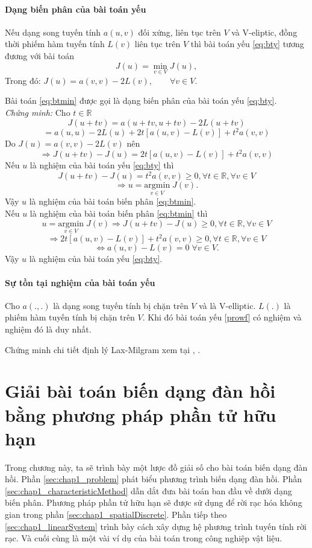 \documentclass[
12pt, %
oneside, %
english, %
onehalfspacing, %
nolistspacing, %
headsepline, %
addchap,
]{MastersDoctoralThesis} %
\renewcommand{\baselinestretch}{1.5}
\begin{document}
\subsubsection*{Dạng biến phân của bài toán yếu}
\begin{lem}
Nếu dạng song tuyến tính $a(u,v)$ đối xứng, liên tục trên $V$ và V-eliptic, đồng thời phiếm hàm tuyến tính $L(v)$ liên tục trên $V$ thì bài toán yếu \ref{eq:bty} tương đương với bài toán
\begin{equation}\label{eq:btmin}
J(u)=\min_{v\in V} J(u),
\end{equation}
Trong đó: $J(u) = a(v,v)-2L(v),\qquad\forall v\in V.$
\end{lem}
Bài toán \ref{eq:btmin} được gọi là dạng biến phân của bài toán yếu \eqref{eq:bty}.\\
\textit{Chứng minh:} Cho $t\in \mathbb{R}$
$$J(u+tv)=a(u+tv,u+tv)-2L(u+tv)$$
$$= a(u,u)-2L(u)+2t[a(u,v)-L(v)]+t^2a(v,v)$$
Do $J(u) = a(v,v)-2L(v)$ nên
$$\Rightarrow J(u+tv)-J(u)=2t[a(u,v)-L(v)]+t^2a(v,v)$$
Nếu $u$ là nghiệm của bài toán yếu \ref{eq:bty} thì
$$J(u+tv)-J(u)=t^2a(v,v)\geq 0,\forall t\in\mathbb{R},\forall v\in V$$
$$\Rightarrow u=\underset{v\in V}{\text{argmin}}\;J(v).$$
Vậy $u$ là nghiệm của bài toán biến phân \ref{eq:btmin}.\\
Nếu $u$ là nghiệm của bài toán biến phân \ref{eq:btmin} thì
$$u=\underset{v\in V}{\text{argmin}}\;J(v) \Rightarrow J(u+tv)-J(u)\geq 0,\forall t\in\mathbb{R},\forall v\in V$$
$$\Rightarrow 2t[a(u,v)-L(v)]+t^2a(v,v)\geq 0 ,\forall t\in\mathbb{R},\forall v\in V$$
$$\Leftrightarrow a(u,v)-L(v)=0\; \forall v\in V.$$
Vậy $u$ là nghiệm của bài toán yếu \ref{eq:bty}.
\subsubsection*{Sự tồn tại nghiệm của bài toán yếu}
\begin{thm}\label{thm:LM}
Cho $a(.,.)$ là dạng song tuyến tính bị chặn trên $V$ và là V-elliptic. $L(.)$ là phiếm hàm tuyến tính bị chặn trên $V$. Khi đó bài toán yếu \ref{prowf} có nghiệm và nghiệm đó là duy nhất.
\end{thm}
Chứng minh chi tiết định lý Lax-Milgram xem tại \citep{LAX-1994}, \citep{LAX-1987}.
\chapter{Giải bài toán biến dạng đàn hồi bằng phương pháp phần tử hữu hạn}\label{Chapter1}
\renewcommand{\baselinestretch}{1.25}
\minitoc
\renewcommand{\baselinestretch}{1.5}
Trong chương này, ta sẽ trình bày một lược đồ giải số cho bài toán biến dạng đàn hồi. Phần \ref{sec:chap1_problem} phát biểu phương trình biến dạng đàn hồi. Phần \ref{sec:chap1_characteristicMethod} dẫn dắt đưa bài toán ban đầu về dưới dạng biến phân. Phương pháp phần tử hữu hạn sẽ được sử dụng để rời rạc hóa không gian trong phần \ref{sec:chap1_spatialDiscrete}. Phần tiếp theo \ref{sec:chap1_linearSystem} trình bày cách xây dựng hệ phương trình tuyến tính rời rạc. Và cuối cùng là một vài ví dụ của bài toán trong công nghiệp vật liệu.
\end{document}
